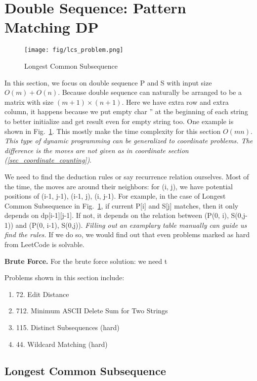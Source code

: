 \documentclass[../main.tex]{subfiles}
\begin{document}
\section{Double Sequence: Pattern Matching DP}
\label{sec_double_sequence}
\begin{figure}[h!]
    \centering
    \texttt{[image: fig/lcs\_problem.png]}
    \caption{Longest Common Subsequence}
    \label{fig:lcs}
\end{figure}
In this section, we focus on double sequence P and S with input size $O(m)+O(n)$. Because double sequence can naturally be arranged to be a matrix with size $(m+1)\times(n+1)$. Here we have extra row and extra column, it happens because we put empty char '' at the beginning of each string to better initialize and get result even for empty string too. One example is shown in Fig.~\ref{fig:lcs}.  This mostly make the time complexity for this section $O(mn)$. \textit{This type of dynamic programming can be generalized to coordinate problems. The difference is the \textit{moves} are not given as in coordinate section (\ref{sec_coordinate_counting})}. 

We need to find the deduction rules  or say recurrence relation ourselves. Most of the time, the moves are around their neighbors: for (i, j), we have potential positions of (i-1, j-1), (i-1, j), (i, j-1). For example, in the case of Longest Common Subsequence in Fig.~\ref{fig:lcs}, if current P[i] and S[j] matches, then it only depends on dp[i-1][j-1]. If not, it depends on the relation between  (P(0, i), S(0,j-1)) and (P(0, i-1), S(0,j)). \textit{Filling out an examplary table manually can guide us find the rules. } If we do so, we would  find out that even problems marked as hard from LeetCode is solvable. 

\textbf{Brute Force.} For the brute force solution: we need t

Problems shown in this section include:

\begin{enumerate}
    \item 72. Edit Distance
    \item 712. Minimum ASCII Delete Sum for Two Strings
    \item 115. Distinct Subsequences (hard)
    \item 44. Wildcard Matching (hard)
\end{enumerate}
\subsection{Longest Common Subsequence}
\end{document}
